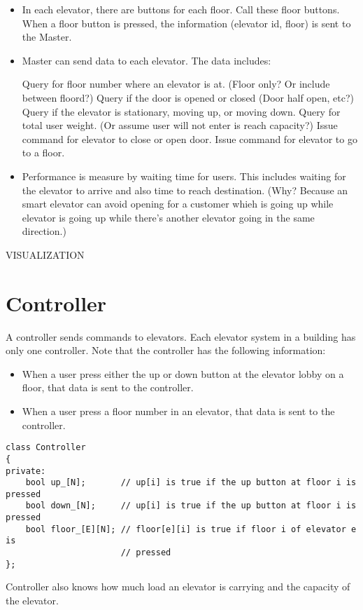 \begin{itemize}
  \item In each elevator, there are buttons for each floor.
  Call these floor buttons.
  When a floor button is pressed, the information (elevator id, floor)
  is sent to the Master.
  
  \item Master can send data to each elevator.
  The data includes:
  \begin{tightlist}
    \li Query for floor number where an elevator is at.
    (Floor only? Or include between floord?)
    \li Query if the door is opened or closed (Door half open, etc?)
    \li Query if the elevator is stationary, moving up, or moving down.
    \li Query for total user weight. (Or assume user will not enter is
    reach capacity?)
    \li Issue command for elevator to close or open door.
    \li Issue command for elevator to go to a floor.
  \end{tightlist}
  
  \item Performance is measure by waiting time for users. This includes
  waiting for the elevator to arrive and also time to reach destination.
  (Why? Because an smart elevator can avoid opening for a customer
  whieh is going up while elevator is going up while there's another
  elevator going in the same direction.)
  
\end{itemize}

\begin{console}
VISUALIZATION


\end{console}


\newpage
\section{Controller}

A controller sends commands to elevators.
Each elevator system in a building has only one controller.
Note that the controller has the following information:
\begin{itemize}
  \item When a user press either the up or down button at the
  elevator lobby on a floor, that data is sent to the controller.
  \item When a user press a floor number
  in an elevator, that data is sent to the controller.
\end{itemize}

\begin{Verbatim}
class Controller
{
private:
    bool up_[N];       // up[i] is true if the up button at floor i is pressed
    bool down_[N];     // up[i] is true if the up button at floor i is pressed
    bool floor_[E][N]; // floor[e][i] is true if floor i of elevator e is
                       // pressed
};
\end{Verbatim}

Controller also knows how much load an elevator is carrying and
the capacity of the elevator.


